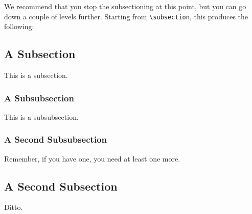 We recommend that you stop the subsectioning at this point, but you can go down a couple of levels further.
Starting from \verb|\subsection|, this produces the following:

\subsection{A Subsection}
\label{sec:latex-sec-sub}

This is a subsection.

\subsubsection{A Subsubsection}
\label{sec:latex-sec-subsub}

This is a subsubsection.

\subsubsection{A Second Subsubsection}
\label{sec:latex-sec-subsub2}

Remember, if you have one, you need at least one more.

\subsection{A Second Subsection}
\label{sec:latex-sub2}

Ditto.
